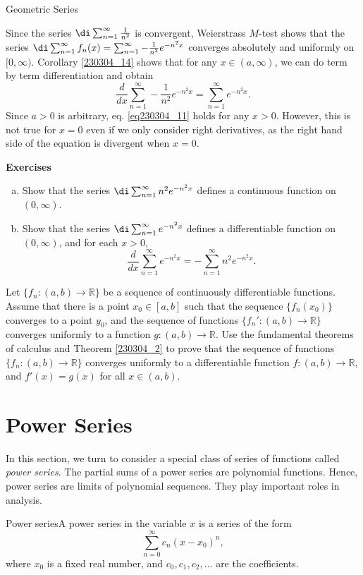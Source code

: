 \begin{example}[label=230305_16]{Geometric Series}
\begin{example}[label=230304_9]{}
\begin{example}{}
Since the series $\di\sum_{n=1}^{\infty}\frac{1}{n^2}$ is convergent, 
 Weierstrass $M$-test shows that the series $\di \sum_{n=1}^{\infty} f_n(x)=\sum_{n=1}^{\infty}-\frac{1}{n^2}e^{-n^2x}$ converges absolutely and uniformly on $[0, \infty)$. Corollary \ref{230304_14} shows that for any $x\in (a, \infty)$, we can do term by term differentiation and obtain
 \begin{equation}\label{eq230304_11}\frac{d}{dx}\sum_{n=1}^{\infty}-\frac{1}{n^2}e^{-n^2x}=\sum_{n=1}^{\infty} e^{-n^2x}.\end{equation}
 Since $a>0$ is arbitrary, eq. \eqref{eq230304_11} holds for any $x>0$. However, this is not true for $x=0$ even if we only consider right derivatives, as the right hand side of the equation is divergent when $x=0$.
\end{example}



\vp
\noindent
{\bf \large Exercises  \thesection}
\setcounter{myquestion}{1}
\begin{question}{\themyquestion}
\begin{enumerate}[(a)]\item Show that 
the series $\di\sum_{n=1}^{\infty} n^2e^{-n^2x}$ defines a continuous function on $(0,\infty)$.
\item 
Show that 
the series $\di\sum_{n=1}^{\infty}  e^{-n^2x}$ defines a differentiable function on $(0,\infty)$, and for each $x>0$,
\[\frac{d}{dx}\sum_{n=1}^{\infty}  e^{-n^2x}=-\sum_{n=1}^{\infty} n^2e^{-n^2x}.\]\end{enumerate}
\end{question}
\atc
\begin{question}{\themyquestion}
 Let $\{f_n:(a,b)\to\mathbb{R}\}$ be a sequence of continuously differentiable  functions. Assume that there is a point $x_0\in [a,b]$ such that the sequence $\{f_n(x_0)\}$ converges to a point $y_0$, and the sequence of functions $\{f_n':(a,b)\to\mathbb{R}\}$ converges uniformly to a function $g:(a,b)\to\mathbb{R}$. Use the fundamental theorems of calculus and Theorem \ref{230304_2} to prove that the sequence of functions $\{f_n:(a,b)\to\mathbb{R}\}$ converges uniformly to a differentiable function $f:(a,b)\to\mathbb{R}$, and $f'(x)=g(x)$ for all $x\in (a,b)$.
\end{question}
 
\vp
\section{Power Series}\label{sec6.4}
In this section, we turn to consider a special class of series of functions  called {\it power series}. The partial sums of a power series are polynomial functions. Hence, power series are limits of polynomial sequences. They play important roles in analysis.
\begin{definition}{Power series}A power series in the variable $x$ is a series of the form
\[\sum_{n=0}^{\infty}c_n(x-x_0)^n,\]
where $x_0$ is a fixed real number, and $c_0, c_1, c_2, \ldots$ are the coefficients. 


\end{definition}
\end{example}
\end{example}
